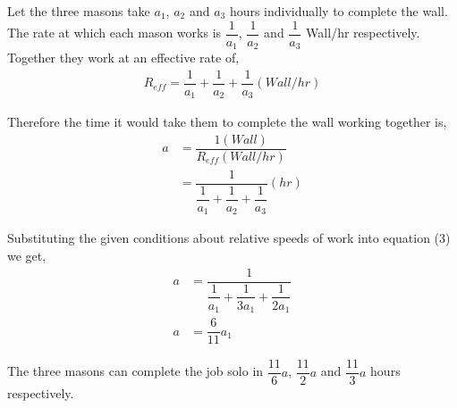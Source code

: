 \begin{solution}
  Let the three masons take $a_1$, $a_2$ and $a_3$ hours individually to complete the wall. The rate at which each mason works is $\dfrac{1}{a_1}$, $\dfrac{1}{a_2}$ and $\dfrac{1}{a_3}$ Wall/hr respectively. Together they work at an effective rate of,
  \begin{align}
	R_{eff} = \dfrac{1}{a_1} + \dfrac{1}{a_2} + \dfrac{1}{a_3} (Wall/hr)
  \end{align}
  
  Therefore the time it would take them to complete the wall working together is,
  \begin{align}
    a &= \dfrac{1(Wall)}{R_{eff}(Wall/hr)} \\
      &= \dfrac{1}{\dfrac{1}{a_1} + \dfrac{1}{a_2} + \dfrac{1}{a_3}}(hr)
  \end{align}  
  
  Substituting the given conditions about relative speeds of work into equation (3) we get,
  \begin{align}
    a &= \dfrac{1}{\dfrac{1}{a_1} + \dfrac{1}{3a_1} + \dfrac{1}{2a_1}} \\
    a &= \dfrac{6}{11}a_1
  \end{align}
  
  The three masons can complete the job solo in $\dfrac{11}{6}a$, $\dfrac{11}{2}a$ and $\dfrac{11}{3}a$ hours respectively.
  
\end{solution}

